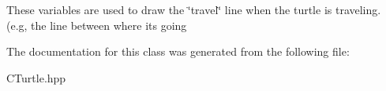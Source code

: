 These variables are used to draw the \char`\"{}travel\char`\"{} line when the turtle is traveling. (e.\+g, the line between where it\textquotesingle{}s going 

The documentation for this class was generated from the following file\+:\begin{DoxyCompactItemize}
\item 
C\+Turtle.\+hpp\end{DoxyCompactItemize}
